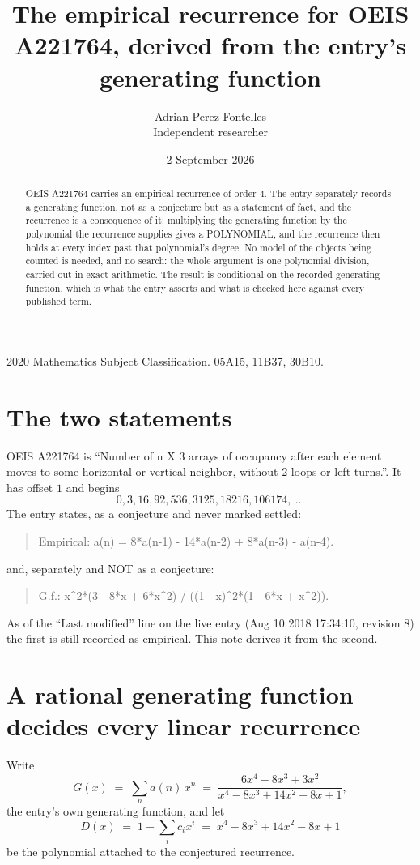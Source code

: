 \documentclass[11pt,a4paper]{article}
\title{The empirical recurrence for OEIS A221764, derived from the entry's generating function}
\author{Adrian Perez Fontelles\\ \small Independent researcher}
\date{2 September 2026}
\theoremstyle{plain}
\theoremstyle{definition}
\begin{document}
\maketitle

\begin{abstract}
OEIS A221764 carries an empirical recurrence of order $4$. The entry separately records a
generating function, not as a conjecture but as a statement of fact, and the recurrence is a
consequence of it: multiplying the generating function by the polynomial the recurrence
supplies gives a POLYNOMIAL, and the recurrence then holds at every index past that
polynomial's degree. No model of the objects being counted is needed, and no search: the
whole argument is one polynomial division, carried out in exact arithmetic. The result is
conditional on the recorded generating function, which is what the entry asserts and what is
checked here against every published term.
\end{abstract}

\noindent\small 2020 Mathematics Subject Classification. 05A15, 11B37, 30B10.\normalsize

\section{The two statements}

OEIS A221764 is ``Number of n X 3 arrays of occupancy after each element moves to some horizontal or vertical neighbor, without 2-loops or left turns.''. It has offset $1$ and begins
\[
0, 3, 16, 92, 536, 3125, 18216, 106174,\ \dots
\]
The entry states, as a conjecture and never marked settled:
\begin{quote}
Empirical: a(n) = 8*a(n-1) - 14*a(n-2) + 8*a(n-3) - a(n-4).
\end{quote}
and, separately and NOT as a conjecture:
\begin{quote}
G.f.: x\^{}2*(3 - 8*x + 6*x\^{}2) / ((1 - x)\^{}2*(1 - 6*x + x\^{}2)).
\end{quote}
As of the ``Last modified'' line on the live entry (Aug 10 2018 17:34:10, revision 8) the first is still
recorded as empirical. This note derives it from the second.

\section{A rational generating function decides every linear recurrence}

Write
\[
G(x)\;=\;\sum_{n}a(n)\,x^{n}\;=\;\frac{6 x^{4} - 8 x^{3} + 3 x^{2}}{x^{4} - 8 x^{3} + 14 x^{2} - 8 x + 1},
\]
the entry's own generating function, and let
\[
D(x)\;=\;1-\sum_i c_i x^{i}\;=\;x^{4} - 8 x^{3} + 14 x^{2} - 8 x + 1
\]
be the polynomial attached to the conjectured recurrence.
\end{document}
